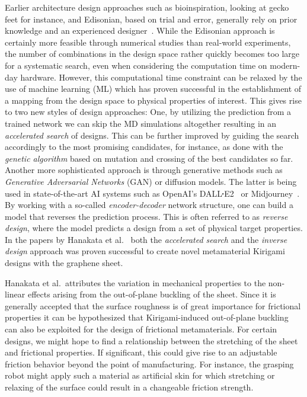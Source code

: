Earlier architecture design approaches such as bioinspiration, looking at gecko
feet for instance, and Edisonian, based on trial and error, generally rely on
prior knowledge and an experienced designer~\cite{Mao}. While the Edisonian
approach is certainly more feasible through numerical studies than real-world
experiments, the number of combinations in the design space rather quickly
becomes too large for a systematic search, even when considering the computation
time on modern-day hardware. However, this computational time constraint can be
relaxed by the use of machine learning (\acrshort{ML}) which has proven
successful in the establishment of a mapping from the design space to physical
properties of interest. This gives rise to two new styles of design approaches:
One, by utilizing the prediction from a trained network we can skip the
\acrshort{MD} simulations altogether resulting in an \textit{accelerated search}
of designs. This can be further improved by guiding the search accordingly to
the most promising candidates, for instance, as done with the \textit{genetic
algorithm} based on mutation and crossing of the best candidates so far. Another
more sophisticated approach is through generative methods such as
\textit{Generative Adversarial Networks} (\acrshort{GAN}) or diffusion models. The latter is being used in state-of-the-art AI systems such as OpenAI's DALL$\sq$E2~\cite{DALLE} or Midjourney~\cite{Midjourney}. By working with a so-called \textit{encoder-decoder}
network structure, one can build a model that reverses the prediction process. This is often referred to as \textit{reverse design}, where the model predicts a design from a set of physical target properties.
In the papers by Hanakata et al.~\cite{PhysRevLett.121.255304, PhysRevResearch.2.042006} both the \textit{accelerated search} and the
\textit{inverse design} approach was proven successful to create novel
metamaterial Kirigami designs with the graphene sheet. 

Hanakata et al.\ attributes the variation in mechanical properties to the non-linear effects arising from the out-of-plane buckling of the sheet. Since it is
generally accepted that the surface roughness is of great importance for
frictional properties it can be hypothesized that Kirigami-induced out-of-plane buckling can also be exploited for the design of frictional metamaterials. For
certain designs, we might hope to find a relationship between the stretching of the
sheet and frictional properties. If significant, this could give rise to an adjustable friction behavior beyond the point of manufacturing. For
instance, the grasping robot might apply such a material as artificial skin for
which stretching or relaxing of the surface could result in a changeable friction strength.

